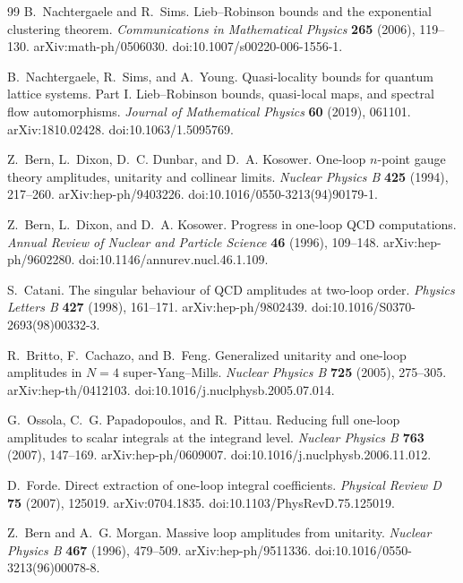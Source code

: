 \begin{thebibliography}{99}
B.~Nachtergaele and R.~Sims.
Lieb--Robinson bounds and the exponential clustering theorem.
\emph{Communications in Mathematical Physics} \textbf{265} (2006), 119--130.
arXiv:math-ph/0506030.
doi:10.1007/s00220-006-1556-1.

B.~Nachtergaele, R.~Sims, and A.~Young.
Quasi-locality bounds for quantum lattice systems. Part I. Lieb--Robinson
bounds, quasi-local maps, and spectral flow automorphisms.
\emph{Journal of Mathematical Physics} \textbf{60} (2019), 061101.
arXiv:1810.02428.
doi:10.1063/1.5095769.

Z.~Bern, L.~Dixon, D.~C. Dunbar, and D.~A. Kosower.
One-loop \(n\)-point gauge theory amplitudes, unitarity and collinear limits.
\emph{Nuclear Physics B} \textbf{425} (1994), 217--260.
arXiv:hep-ph/9403226.
doi:10.1016/0550-3213(94)90179-1.

Z.~Bern, L.~Dixon, and D.~A. Kosower.
Progress in one-loop QCD computations.
\emph{Annual Review of Nuclear and Particle Science} \textbf{46} (1996),
109--148.
arXiv:hep-ph/9602280.
doi:10.1146/annurev.nucl.46.1.109.

S.~Catani.
The singular behaviour of QCD amplitudes at two-loop order.
\emph{Physics Letters B} \textbf{427} (1998), 161--171.
arXiv:hep-ph/9802439.
doi:10.1016/S0370-2693(98)00332-3.

R.~Britto, F.~Cachazo, and B.~Feng.
Generalized unitarity and one-loop amplitudes in \(N=4\) super-Yang--Mills.
\emph{Nuclear Physics B} \textbf{725} (2005), 275--305.
arXiv:hep-th/0412103.
doi:10.1016/j.nuclphysb.2005.07.014.

G.~Ossola, C.~G. Papadopoulos, and R.~Pittau.
Reducing full one-loop amplitudes to scalar integrals at the integrand level.
\emph{Nuclear Physics B} \textbf{763} (2007), 147--169.
arXiv:hep-ph/0609007.
doi:10.1016/j.nuclphysb.2006.11.012.

D.~Forde.
Direct extraction of one-loop integral coefficients.
\emph{Physical Review D} \textbf{75} (2007), 125019.
arXiv:0704.1835.
doi:10.1103/PhysRevD.75.125019.

Z.~Bern and A.~G. Morgan.
Massive loop amplitudes from unitarity.
\emph{Nuclear Physics B} \textbf{467} (1996), 479--509.
arXiv:hep-ph/9511336.
doi:10.1016/0550-3213(96)00078-8.


\end{thebibliography}
